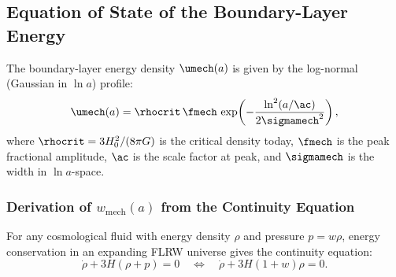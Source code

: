 %
%


\subsection{Equation of State of the Boundary-Layer Energy}
\label{sec:w_mech_derivation}

The boundary-layer energy density $\umech(a)$ is given by the log-normal (Gaussian in $\ln a$) profile:
\begin{equation}
\label{eq:umech_profile}
\umech(a) = \rhocrit \, \fmech \, \exp\!\left( -\frac{\ln^2(a/\ac)}{2\sigmamech^2} \right),
\end{equation}
where $\rhocrit = 3H_0^2/(8\pi G)$ is the critical density today, $\fmech$ is the peak fractional amplitude, $\ac$ is the scale factor at peak, and $\sigmamech$ is the width in $\ln a$-space.

\subsubsection{Derivation of $w_{\mathrm{mech}}(a)$ from the Continuity Equation}

For any cosmological fluid with energy density $\rho$ and pressure $p = w\rho$, energy conservation in an expanding FLRW universe gives the continuity equation:
\begin{equation}
\label{eq:continuity_general}
\dot{\rho} + 3H(\rho + p) = 0 \quad \Longleftrightarrow \quad \dot{\rho} + 3H(1+w)\rho = 0.
\end{equation}

